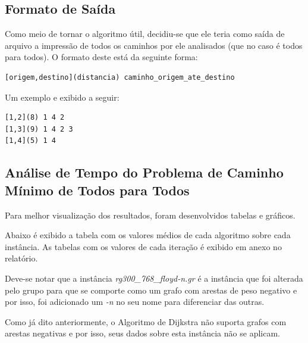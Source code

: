 \documentclass[12pt]{article}
\begin{document}
\subsection{Formato de Saída}

Como meio de tornar o algoritmo útil, decidiu-se que ele teria como saída de arquivo a impressão de todos os caminhos por ele analisados (que no caso é todos para todos). O formato deste está da seguinte forma:

\begin{verbatim}
[origem,destino](distancia) caminho_origem_ate_destino
\end{verbatim}

Um exemplo e exibido a seguir:

\begin{verbatim}
[1,2](8) 1 4 2
[1,3](9) 1 4 2 3
[1,4](5) 1 4
\end{verbatim}


\subsection{Análise de Tempo do Problema de Caminho Mínimo de Todos para Todos}

Para melhor visualização dos resultados, foram desenvolvidos tabelas e gráficos.

Abaixo é exibido a tabela com os valores médios de cada algoritmo sobre cada instância. As tabelas com os valores de cada iteração é exibido em anexo no relatório.

Deve-se notar que a instância \textit{rg300\_768\_floyd-n.gr} é a instância que foi alterada pelo grupo para que se comporte como um grafo com arestas de peso negativo e por isso, foi adicionado um \textit{-n} no seu nome para diferenciar das outras. 

Como já dito anteriormente, o Algoritmo de Dijkstra não suporta grafos com arestas negativas e por isso, seus dados sobre esta instância não se aplicam.
\end{document}
